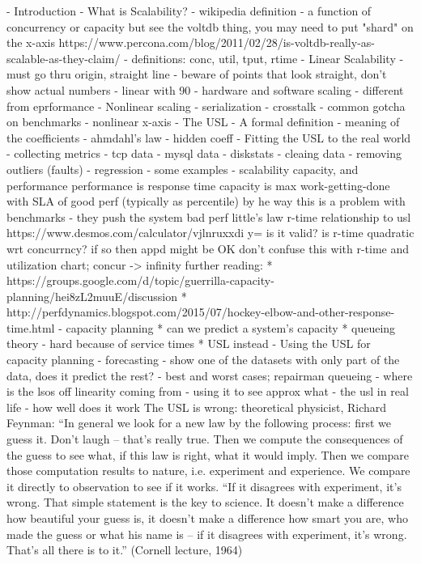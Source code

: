 \documentclass{vivid_layout_pdf}
\begin{document}
- Introduction
- What is Scalability?
	- wikipedia definition
   - a function of concurrency or capacity
	  but see the voltdb thing, you may need to put "shard" on the x-axis
	  https://www.percona.com/blog/2011/02/28/is-voltdb-really-as-scalable-as-they-claim/
	- definitions: conc, util, tput, rtime
	- Linear Scalability
	- must go thru origin, straight line
	- beware of points that look straight, don't show actual numbers
	- linear with 90%
	- hardware and software scaling
	- different from eprformance
- Nonlinear scaling
  - serialization
  - crosstalk
  - common gotcha on benchmarks - nonlinear x-axis
- The USL
	- A formal definition
	- meaning of the coefficients
	- ahmdahl's law
	- hidden coeff
- Fitting the USL to the real world
	- collecting metrics
		- tcp data
		- mysql data
		- diskstats
	- cleaing data - removing outliers (faults)
	- regression
	- some examples
- scalability capacity, and performance
  performance is response time
  capacity  is max work-getting-done with SLA of good perf (typically as percentile)
	 by he way this is a problem with benchmarks - they push the system bad perf
	little's law
	r-time relationship to usl
	https://www.desmos.com/calculator/vjlnruxxdi
	y=
	is it valid? is r-time quadratic wrt concurrncy? if so then appd might be OK
	don't confuse this with r-time and utilization chart; concur -> infinity
	further reading:
 * https://groups.google.com/d/topic/guerrilla-capacity-planning/hei8zL2muuE/discussion
  * http://perfdynamics.blogspot.com/2015/07/hockey-elbow-and-other-response-time.html
- capacity planning
      * can we predict a system’s capacity
		    * queueing theory - hard because of service times
			     * USL instead
- Using the USL for capacity planning
  - forecasting
  - show one of the datasets with only part of the data, does it predict the
  rest?
  - best and worst cases; repairman queueing
  - where is the lsos off linearity coming from
  - using it to see approx what %
- the usl in real life
  - how well does it work
	The USL is wrong:
	theoretical physicist, Richard Feynman:
	“In general we look for a new law by the following process: first we guess it.
	Don’t laugh -- that’s really true. Then we compute the consequences of the guess
	to see what, if this law is right, what it would imply. Then we compare those
	computation results to nature, i.e. experiment and experience. We compare it
	directly to observation to see if it works.
	“If it disagrees with experiment, it’s wrong. That simple statement is the key
	to science. It doesn’t make a difference how beautiful your guess is, it doesn’t
	make a difference how smart you are, who made the guess or what his name is --
	if it disagrees with experiment, it’s wrong. That’s all there is to it.”
	(Cornell lecture, 1964)
\end{document}
